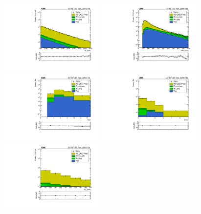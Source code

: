 \begin{figure}[!htbp]
  \begin{center}
    \includegraphics[width=0.46\textwidth]{figs/qcd/rs_data/c_crRSDPhiMT2InclusiveHT1200toInf_h_ht.pdf}
    \includegraphics[width=0.46\textwidth]{figs/qcd/rs_data/c_crRSDPhiMT2InclusiveHT1200toInf_h_met.pdf}
    \includegraphics[width=0.46\textwidth]{figs/qcd/rs_data/c_crRSDPhiMT2InclusiveHT1200toInf_h_nJet30.pdf}
    \includegraphics[width=0.46\textwidth]{figs/qcd/rs_data/c_crRSDPhiMT2InclusiveHT1200toInf_h_nBJet20.pdf}
    \includegraphics[width=0.46\textwidth]{figs/qcd/rs_data/c_crRSDPhiMT2InclusiveHT1200toInf_h_mt2.pdf}

\end{center}
\end{figure}
